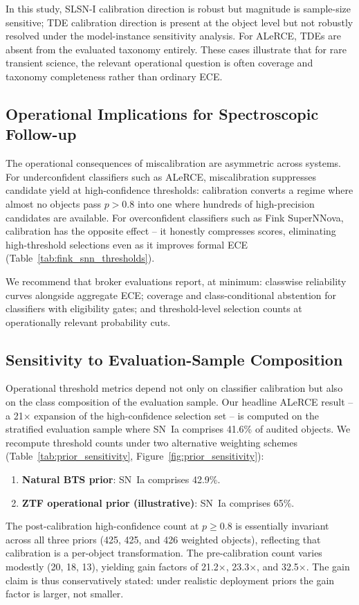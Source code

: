 \documentclass[twocolumn]{aastex631}
\begin{document}
In this study, SLSN-I calibration direction is robust but
magnitude is sample-size sensitive; TDE calibration direction is
present at the object level but not robustly resolved under the
model-instance sensitivity analysis. For ALeRCE, TDEs are absent
from the evaluated taxonomy entirely. These cases illustrate that
for rare transient science, the relevant operational question is
often coverage and taxonomy completeness rather than ordinary ECE.

\subsection{Operational Implications for Spectroscopic
Follow-up}\label{sec:disc_operational}

The operational consequences of miscalibration are asymmetric
across systems. For underconfident classifiers such as ALeRCE,
miscalibration suppresses candidate yield at high-confidence
thresholds: calibration converts a regime where almost no objects
pass $p > 0.8$ into one where hundreds of high-precision candidates
are available. For overconfident classifiers such as Fink
SuperNNova, calibration has the opposite effect -- it honestly
compresses scores, eliminating high-threshold selections even as
it improves formal ECE (Table~\ref{tab:fink_snn_thresholds}).

We recommend that broker evaluations report, at minimum:
classwise reliability curves alongside aggregate ECE; coverage
and class-conditional abstention for classifiers with eligibility
gates; and threshold-level selection counts at operationally
relevant probability cuts.

\subsection{Sensitivity to Evaluation-Sample Composition}
\label{sec:prior_sensitivity}

Operational threshold metrics depend not only on classifier
calibration but also on the class composition of the evaluation
sample. Our headline ALeRCE result -- a 21$\times$ expansion of
the high-confidence selection set -- is computed on the stratified
evaluation sample where SN~Ia comprises 41.6\% of audited objects.
We recompute threshold counts under two alternative weighting
schemes (Table~\ref{tab:prior_sensitivity},
Figure~\ref{fig:prior_sensitivity}):
\begin{enumerate}
\item \textbf{Natural BTS prior}: SN~Ia comprises 42.9\%.
\item \textbf{ZTF operational prior (illustrative)}: SN~Ia
comprises 65\%.
\end{enumerate}
The post-calibration high-confidence count at $p \geq 0.8$ is
essentially invariant across all three priors (425, 425, and 426
weighted objects), reflecting that calibration is a per-object
transformation. The pre-calibration count varies modestly (20, 18,
13), yielding gain factors of 21.2$\times$, 23.3$\times$, and
32.5$\times$. The gain claim is thus conservatively stated: under
realistic deployment priors the gain factor is larger, not smaller.
\end{document}

